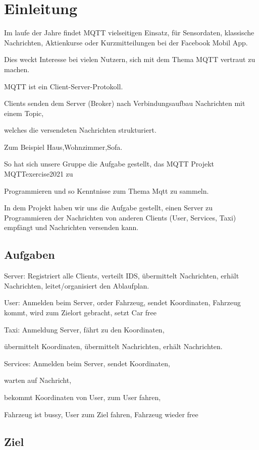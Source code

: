 \section{Einleitung}


Im laufe der Jahre findet MQTT vielseitigen Einsatz, für Sensordaten, 
klassische Nachrichten, Aktienkurse oder Kurzmitteilungen bei der Facebook Mobil App.


Dies weckt Interesse bei vielen Nutzern, 
sich mit dem Thema MQTT vertraut zu machen.


MQTT ist ein Client-Server-Protokoll.
 

Clients senden dem Server (Broker) 
nach Verbindungsaufbau Nachrichten mit einem Topic, 

welches die versendeten Nachrichten strukturiert. 

Zum Beispiel Haus,Wohnzimmer,Sofa.


So hat sich unsere Gruppe die Aufgabe gestellt, 
das MQTT Projekt MQTTexercise2021 zu 

Programmieren und so Kenntnisse zum Thema Mqtt zu sammeln.


In dem Projekt haben wir uns die Aufgabe gestellt, 
einen Server zu Programmieren der Nachrichten von anderen Clients (User, Services, Taxi) empfängt und Nachrichten versenden kann.


\subsection{Aufgaben}

Server: Registriert alle Clients, verteilt IDS, übermittelt Nachrichten, 
erhält Nachrichten, leitet/organisiert den Ablaufplan.


User: Anmelden beim Server, order Fahrzeug, sendet Koordinaten, Fahrzeug kommt, wird zum Zielort gebracht, setzt Car free


Taxi: Anmeldung Server, fährt zu den Koordinaten, 

übermittelt Koordinaten, übermittelt Nachrichten, erhält Nachrichten.


Services: Anmelden beim Server, sendet Koordinaten, 

warten auf Nachricht, 

bekommt Koordinaten von User, zum User fahren, 

Fahrzeug ist  bussy, User zum Ziel fahren, Fahrzeug wieder free

\subsection{Ziel}

